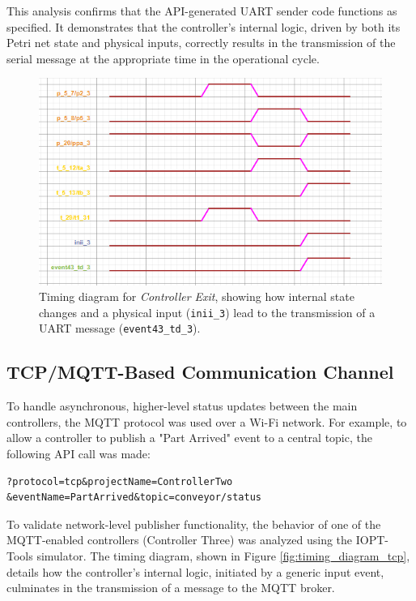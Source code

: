 This analysis confirms that the API-generated UART sender code functions as specified. It demonstrates that the controller's internal logic, driven by both its Petri net state and physical inputs, correctly results in the transmission of the serial message at the appropriate time in the operational cycle.

\begin{figure}[htb!]
    \centering
    \includegraphics[width=\columnwidth]{Chapters/Figures/timing_diagram_controller_three.png}
    \caption{Timing diagram for \textit{Controller Exit}, showing how internal state changes and a physical input (\texttt{inii\_3}) lead to the transmission of a UART message (\texttt{event43\_td\_3}).}
    \label{fig:timing_diagram_controller_three}
\end{figure}

\subsection{TCP/MQTT-Based Communication Channel}
\label{subsec:tcp_implementation}

To handle asynchronous, higher-level status updates between the main controllers, the MQTT protocol was used over a Wi-Fi network. For example, to allow a controller to publish a "Part Arrived" event to a central topic, the following API call was made:

\begin{verbatim}
?protocol=tcp&projectName=ControllerTwo
&eventName=PartArrived&topic=conveyor/status
\end{verbatim}

To validate network-level publisher functionality, the behavior of one of the MQTT-enabled controllers (Controller Three) was analyzed using the IOPT-Tools simulator. The timing diagram, shown in Figure \ref{fig:timing_diagram_tcp}, details how the controller's internal logic, initiated by a generic input event, culminates in the transmission of a message to the MQTT broker.

